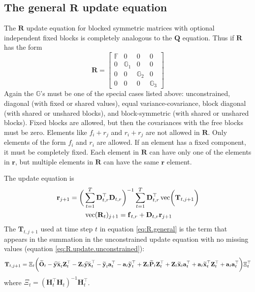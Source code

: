 \documentclass[]{article}
\def\ZZ{\mbox{$\mathbf Z$}}	\def\zz{\mbox{$\mathbf z$}}
\def\DD{\mbox{$\mathbf D$}}	\def\dd{\mbox{$\mathbf d$}}
\def\HH{\mbox{$\mathbf H$}}	\def\hh{\mbox{$\mathbf h$}}
\def\OO{\mbox{$\mathbf O$}}
\def\PP{\mbox{$\mathbf P$}}  \def\pp{\mbox{$\mathbf p$}}
\def\QQ{\mbox{$\mathbf Q$}}	 \def\qq{\mbox{$\mathbf q$}}
\def\RR{\mbox{$\mathbf R$}}	 \def\rr{\mbox{$\mathbf r$}}
\def\TT{\mbox{$\mathbf T$}}
\def\vec{\,\textup{\textrm{vec}}}
\def\hatxt{\widetilde{\mbox{$\mathbf x$}}_t}
\def\hatyt{\widetilde{\mbox{$\mathbf y$}}_t}
\def\hatOt{\widetilde{\OO}_t}
\def\hatYXt{\widetilde{\mbox{$\mathbf{y}\mathbf{x}$}}_t}
\def\hatPt{\widetilde{\PP}_t}
\begin{document}
\subsection{The general $\RR$ update equation}
The $\RR$ update equation for blocked symmetric matrices with optional independent fixed blocks is completely analogous to the $\QQ$ equation.  Thus if $\RR$ has the form
\begin{equation*}
\RR=
\begin{bmatrix}
\mathbb{F}&0&0&0\\
0&\mathbb{G}_1&0&0\\
0&0&\mathbb{G}_2&0\\
0&0&0&\mathbb{G}_3
\end{bmatrix}
\end{equation*}
Again the $\mathbb{G}$'s must be one of the special cases listed above: unconstrained, diagonal (with fixed or shared values), equal variance-covariance, block diagonal (with shared or unshared blocks), and block-symmetric (with shared or unshared blocks).  Fixed blocks are allowed, but then the covariances with the free blocks must be zero.  Elements like $f_i+r_j$ and $r_i+r_j$ are not allowed in $\RR$. Only elements of the form $f_i$ and $r_i$ are allowed.  If an element has a fixed component, it must be completely fixed.  Each element in $\RR$ can have only one of the elements in $\rr$, but multiple elements in $\RR$ can have the same $\rr$ element.

The update equation is
\begin{equation}\label{eq:R.general}
\begin{split}
&\rr_{j+1}  =   
\bigg(\sum_{t=1}^T\DD_{t,r}^\top \DD_{t,r}\bigg)^{-1} \sum_{t=1}^T \DD_{t,r}^\top\vec\bigg(\TT_{t,{j+1}}  
 \bigg)\\
&\quad\quad\quad\quad\vec(\RR_t)_{j+1} = \ff_{t,r} + \DD_{t,r} \rr_{j+1}
\end{split}
\end{equation}
The $\TT_{t,j+1}$ used at time step $t$ in equation \ref{eq:R.general} is the term that appears in the summation in the unconstrained update equation with no missing values (equation \ref{eq:R.update.unconstrained}):
\begin{equation}
\begin{split}
\TT_{t,j+1}=\Xi_t\bigg(  
 \hatOt - \hatYXt\ZZ_t^\top - \ZZ_t\hatYXt^\top 
 - \hatyt\aa_t^\top - \aa_t\hatyt^\top 
 + \ZZ_t\hatPt\ZZ_t^\top + \ZZ_t\hatxt\aa_t^\top + \aa_t\hatxt^\top\ZZ_t^\top 
 + \aa_t\aa_t^\top \bigg)\Xi_t^\top
\end{split}
\end{equation}
where $\Xi_t = (\HH_t^\top\HH_t)^{-1}\HH_t^\top$.
\end{document}
